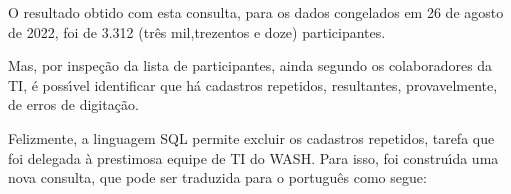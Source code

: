 \documentclass[
12pt,		%
openright,	%
twoside,  %
a4paper,			%
chapter=TITLE,		%
english,			%
french,				%
spanish,			%
brazil				%
]{USPSC-classe/USPSC}
\begin{document}
\noindent\begin{center}\mbox{\centering{}}\end{center}

















O resultado obtido com esta consulta, para os dados congelados em 26 de agosto de 2022, foi de 3.312 (tr\^es mil,trezentos e doze) participantes.














Mas, por inspe\c{c}\~ao da lista de participantes, ainda segundo os colaboradores da TI, \'e poss\'{\i}vel identificar que h\'a cadastros repetidos, resultantes, provavelmente, de erros de digita\c{c}\~ao.














Felizmente, a linguagem SQL permite excluir os cadastros repetidos, tarefa que foi delegada \`a prestimosa equipe de TI do WASH. Para isso, foi constru\'{\i}da uma nova consulta, que pode ser traduzida para o portugu\^es como segue:















\noindent\begin{center}\mbox{\centering{}}\end{center}
\end{document}
